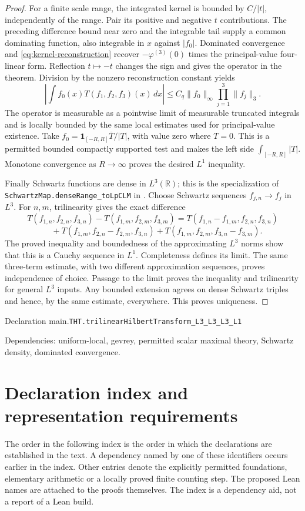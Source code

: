 \documentclass[11pt]{article}
\theoremstyle{definition}
\newcommand{\R}{\mathbb R}
\newcommand{\one}{\mathbf 1}
\numberwithin{equation}{section}
\newcommand{\bp}[3]{\par\smallskip\begingroup\footnotesize
\noindent\hypertarget{bp:#1}{\textsf{Declaration #1.}}\quad\nolinkurl{#2}\par
\noindent\textsf{Dependencies:} #3.\par\endgroup\smallskip}
\begin{document}
\begin{proof}
For a finite scale range, the integrated kernel is bounded by $C/|t|$, independently of the range. Pair its positive and negative $t$ contributions. The preceding difference bound near zero and the integrable tail supply a common dominating function, also integrable in $x$ against $|f_0|$. Dominated convergence and \eqref{eq:kernel-reconstruction} recover $-\varphi^{(3)}(0)$ times the principal-value four-linear form. Reflection $t\mapsto-t$ changes the sign and gives the operator in the theorem. Division by the nonzero reconstruction constant yields
\[
 \left|\int f_0(x)T(f_1,f_2,f_3)(x)\,dx\right|
 \le C_q\|f_0\|_\infty\prod_{j=1}^3\|f_j\|_3.
\]
The operator is measurable as a pointwise limit of measurable truncated integrals and is locally bounded by the same local estimates used for principal-value existence. Take $f_0=\one_{[-R,R]}\overline{T}/|T|$, with value zero where $T=0$. This is a permitted bounded compactly supported test and makes the left side $\int_{[-R,R]}|T|$. Monotone convergence as $R\to\infty$ proves the desired $L^1$ inequality.

Finally Schwartz functions are dense in $L^3(\R)$; this is the specialization of \nolinkurl{SchwartzMap.denseRange_toLpCLM} in \cite{mathlibSchwartz}. Choose Schwartz sequences $f_{j,n}\to f_j$ in $L^3$. For $n,m$, trilinearity gives the exact difference
\[
 T(f_{1,n},f_{2,n},f_{3,n})-T(f_{1,m},f_{2,m},f_{3,m})
 =T(f_{1,n}-f_{1,m},f_{2,n},f_{3,n})
\]
\[
 \hspace{1em}+T(f_{1,m},f_{2,n}-f_{2,m},f_{3,n})
 +T(f_{1,m},f_{2,m},f_{3,n}-f_{3,m}).
\]
The proved inequality and boundedness of the approximating $L^3$ norms show that this is a Cauchy sequence in $L^1$. Completeness defines its limit. The same three-term estimate, with two different approximation sequences, proves independence of choice. Passage to the limit proves the inequality and trilinearity for general $L^3$ inputs. Any bounded extension agrees on dense Schwartz triples and hence, by the same estimate, everywhere. This proves uniqueness.
\end{proof}
\bp{main}{THT.trilinearHilbertTransform_L3_L3_L3_L1}{uniform-local, gevrey, permitted scalar maximal theory, Schwartz density, dominated convergence}

\appendix
\section{Declaration index and representation requirements}
The order in the following index is the order in which the declarations are established in the text. A dependency named by one of these identifiers occurs earlier in the index. Other entries denote the explicitly permitted foundations, elementary arithmetic or a locally proved finite counting step. The proposed Lean names are attached to the proofs themselves. The index is a dependency aid, not a report of a Lean build.
\end{document}
